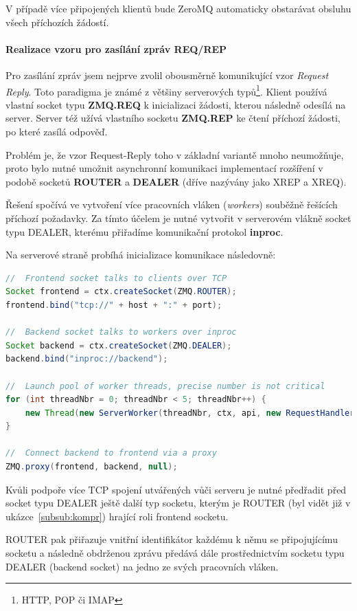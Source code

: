 \documentclass[thesis=M,czech]{FITthesis}[2014/05/07]
\begin{document}
V případě více připojených klientů bude ZeroMQ automaticky obstarávat obsluhu všech příchozích žádostí. 

\paragraph{Realizace vzoru pro zasílání zpráv REQ/REP}
Pro zasílání zpráv jsem nejprve zvolil obousměrně komunikující vzor \emph{Request Reply}. Toto paradigma je známé z většiny serverových typů\footnote{HTTP, POP či IMAP}. Klient používá vlastní socket typu \textbf{ZMQ.REQ} k inicializaci žádosti, kterou následně odesílá na server. Server též užívá vlastního socketu \textbf{ZMQ.REP} ke čtení příchozí žádosti, po které zasílá odpověď. 

Problém je, že vzor Request-Reply toho v základní variantě mnoho neumožňuje, proto bylo nutné umožnit asynchronní komunikaci implementací rozšíření v podobě socketů \textbf{ROUTER} a \textbf{DEALER} (dříve nazývány jako XREP a XREQ). 

Řešení spočívá ve vytvoření více pracovních vláken (\emph{workers}) souběžně řešících příchozí požadavky. Za tímto účelem je nutné vytvořit v serverovém vlákně socket typu DEALER, kterému přiřadíme komunikační protokol \textbf{inproc}.

Na serverové straně probíhá inicializace komunikace následovně: 

\begin{lstlisting}[language=java]
//  Frontend socket talks to clients over TCP
Socket frontend = ctx.createSocket(ZMQ.ROUTER);
frontend.bind("tcp://" + host + ":" + port);

//  Backend socket talks to workers over inproc
Socket backend = ctx.createSocket(ZMQ.DEALER);
backend.bind("inproc://backend");

//  Launch pool of worker threads, precise number is not critical
for (int threadNbr = 0; threadNbr < 5; threadNbr++) {
    new Thread(new ServerWorker(threadNbr, ctx, api, new RequestHandlerJson(), new ResponseHandlerJson())).start();
}

//  Connect backend to frontend via a proxy
ZMQ.proxy(frontend, backend, null);
\end{lstlisting}

Kvůli podpoře více TCP spojení utvářených vůči serveru je nutné předřadit před socket typu DEALER ještě další typ socketu, kterým je ROUTER (byl vidět již v ukázce~\ref{subsub:kompr}) hrající roli frontend socketu. 

ROUTER pak přiřazuje vnitřní identifikátor každému k němu se připojujícímu socketu a následně obdrženou zprávu předává dále prostřednictvím socketu typu DEALER (backend socket) na jedno ze svých pracovních vláken.
\end{document}

